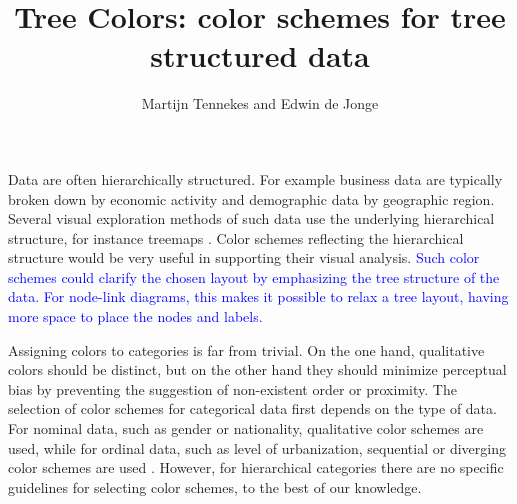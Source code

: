 \documentclass[journal]{vgtc}                %
\title{Tree Colors: color schemes for tree structured data}
\author{Martijn Tennekes and Edwin de Jonge}
\newcommand{\E}{\textcolor{cornellred}{\textbf{TO DO Edwin}}}
\newcommand{\changedE}[1]{\textcolor{cornellred}{#1}}
\newcommand{\changedM}[1]{\textcolor{blue}{#1}}
\begin{document}
\lstset{language=R}

\label{secintro}

\maketitle
Data are often hierarchically structured. For example business data are typically broken down by economic activity and demographic data by geographic region. Several visual exploration methods of such data use the underlying hierarchical structure, for instance treemaps
\cite{shneiderman1992,tennekes2011b}. Color schemes reflecting the hierarchical structure would be very useful in supporting their visual analysis. 
\changedM{Such color schemes could clarify the chosen layout by emphasizing the tree structure of the data. For node-link diagrams, this makes it possible to relax a tree layout, having more space to place the nodes and labels.}

Assigning colors to categories is far from trivial. On the one hand, qualitative colors should be distinct, but on the other hand they should minimize perceptual bias by preventing the suggestion of non-existent order or proximity. The selection of color schemes for categorical data first depends on the type of data. For nominal data, such as gender or nationality, qualitative color schemes are used, while for ordinal data, such as level of urbanization, sequential or diverging color schemes are used \cite{brewer03, zeileis2009}. However, for hierarchical categories there are no specific guidelines for selecting color schemes, to the best of our knowledge.


 
\end{document}

